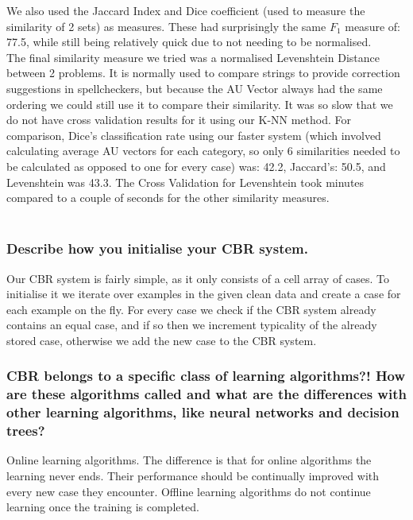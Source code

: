 \documentclass[12pt]{article}
\begin{document}
We also used the Jaccard Index and Dice coefficient (used to measure the similarity of 2 sets) as measures. These had surprisingly the same $F_1$ measure of: 77.5, while still being relatively quick due to not needing to be normalised. \\

The final similarity measure we tried was a normalised Levenshtein Distance between 2 problems. It is normally used to compare strings to provide correction suggestions in spellcheckers, but because the AU Vector always had the same ordering we could still use it to compare their similarity. It was so slow that we do not have cross validation results for it using our K-NN method. For comparison, Dice's classification rate using our faster system (which involved calculating average AU vectors for each category, so only 6 similarities needed to be calculated as opposed to one for every case) was: 42.2, Jaccard's: 50.5, and Levenshtein was 43.3. The Cross Validation for Levenshtein took minutes compared to a couple of seconds for the other similarity measures.  \\ \\

\subsubsection*{Describe how you initialise your CBR system.}

Our CBR system is fairly simple, as it only consists of a cell array of cases. To initialise it we iterate over examples in the given clean data and create a case for each example on the fly. For every case we check if the CBR system already contains an equal case, and if so then we increment typicality of the already stored case, otherwise we add the new case to the CBR system.

\subsubsection*{CBR belongs to a specific class of learning algorithms?! How are these algorithms called and what are the differences with other learning algorithms, like neural networks and decision trees?}

Online learning algorithms. The difference is that for online algorithms the learning never ends. Their performance should be continually improved with every new case they encounter. Offline learning algorithms do not continue learning once the training is completed.
\end{document}
